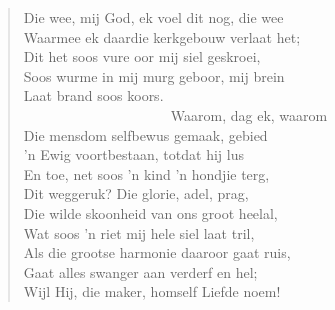 \begin{verse}
Die wee, mij God, ek voel dit nog, die wee \\ 
Waarmee ek daardie kerkgebouw verlaat het; \\ 
Dit het soos vure oor mij siel geskroei, \\ 
Soos wurme in mij murg geboor, mij brein \\ 
Laat brand soos koors. \\ 
\ \ \ \ \ \ \ \ \ \ \ \ \ \ \ \ \ \ \ \ \ Waarom, dag ek, waarom \\ 
Die mensdom selfbewus gemaak, gebied \\ 
’n Ewig voortbestaan, totdat hij lus \\ 
En toe, net soos ’n kind ’n hondjie terg, \\ 
Dit weggeruk? Die glorie, adel, prag, \\ 
Die wilde skoonheid van ons groot heelal, \\ 
Wat soos ’n riet mij hele siel laat tril, \\ 
Als die grootse harmonie daaroor gaat ruis, \\ 
Gaat alles swanger aan verderf en hel; \\ 
Wijl Hij, die maker, homself Liefde noem! \\ 
\end{verse}


